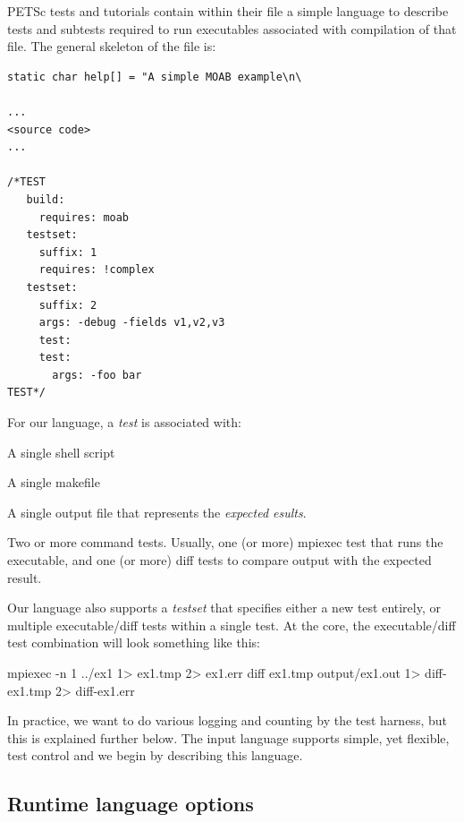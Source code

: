 PETSc tests and tutorials contain within their file a simple language to
describe tests and subtests required to run executables associated with
compilation of that file.  The general skeleton of the file is:
%
\begin{lstlisting}
static char help[] = "A simple MOAB example\n\

...
<source code>
...

/*TEST
   build:
     requires: moab
   testset:
     suffix: 1
     requires: !complex
   testset:
     suffix: 2
     args: -debug -fields v1,v2,v3
     test:
     test:
       args: -foo bar
TEST*/
\end{lstlisting}

For our language, a \emph{test} is associated with:
\begin{tightitemize}
  \item A single shell script
  \item A single makefile
  \item A single output file that represents the \emph{expected
       esults}.
  \item Two or more command tests.  Usually, one (or more) mpiexec
        test that runs the executable, and one (or more) diff tests to
        compare output with the expected result.
\end{tightitemize}
Our language also supports a \emph{testset} that specifies
either a new test entirely, or multiple executable/diff tests
within a single test.  At the core, the executable/diff test combination
will look something like this:
\begin{bashlisting}
mpiexec -n 1 ../ex1 1> ex1.tmp 2> ex1.err
diff ex1.tmp output/ex1.out 1> diff-ex1.tmp 2> diff-ex1.err
\end{bashlisting}

In practice, we want to do various logging and counting by the test
harness, but this is explained further below.  The input language
supports simple, yet flexible, test control and we begin by
describing this language.


\subsection{Runtime language options%
  \label{runtime-language-options}%
}

